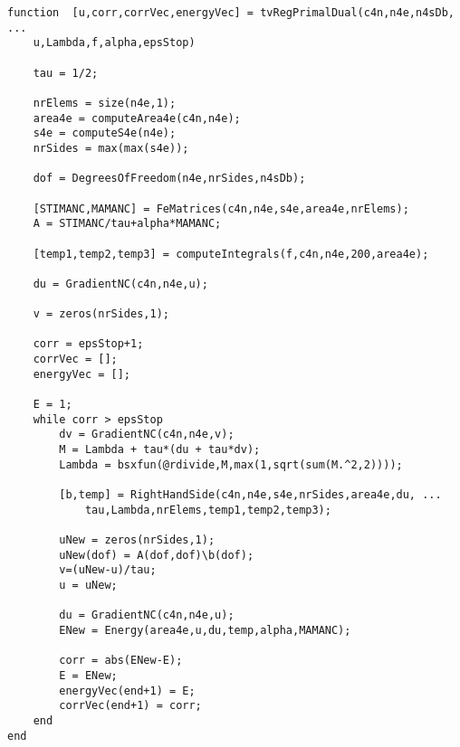 \begin{lstlisting}[frame=single,numbers=none]
function  [u,corr,corrVec,energyVec] = tvRegPrimalDual(c4n,n4e,n4sDb, ...
    u,Lambda,f,alpha,epsStop) 
  
    tau = 1/2;

    nrElems = size(n4e,1);
    area4e = computeArea4e(c4n,n4e);
    s4e = computeS4e(n4e);
    nrSides = max(max(s4e));

    dof = DegreesOfFreedom(n4e,nrSides,n4sDb);

    [STIMANC,MAMANC] = FeMatrices(c4n,n4e,s4e,area4e,nrElems);
    A = STIMANC/tau+alpha*MAMANC; 

    [temp1,temp2,temp3] = computeIntegrals(f,c4n,n4e,200,area4e);

    du = GradientNC(c4n,n4e,u);

    v = zeros(nrSides,1);    

    corr = epsStop+1; 
    corrVec = [];
    energyVec = [];

    E = 1;
    while corr > epsStop
        dv = GradientNC(c4n,n4e,v);
        M = Lambda + tau*(du + tau*dv);
        Lambda = bsxfun(@rdivide,M,max(1,sqrt(sum(M.^2,2))));
        
        [b,temp] = RightHandSide(c4n,n4e,s4e,nrSides,area4e,du, ...
            tau,Lambda,nrElems,temp1,temp2,temp3);     

        uNew = zeros(nrSides,1);
        uNew(dof) = A(dof,dof)\b(dof);
        v=(uNew-u)/tau;        
        u = uNew;

        du = GradientNC(c4n,n4e,u);
        ENew = Energy(area4e,u,du,temp,alpha,MAMANC);

        corr = abs(ENew-E);
        E = ENew;
        energyVec(end+1) = E;
        corrVec(end+1) = corr;
    end
end
\end{lstlisting}
